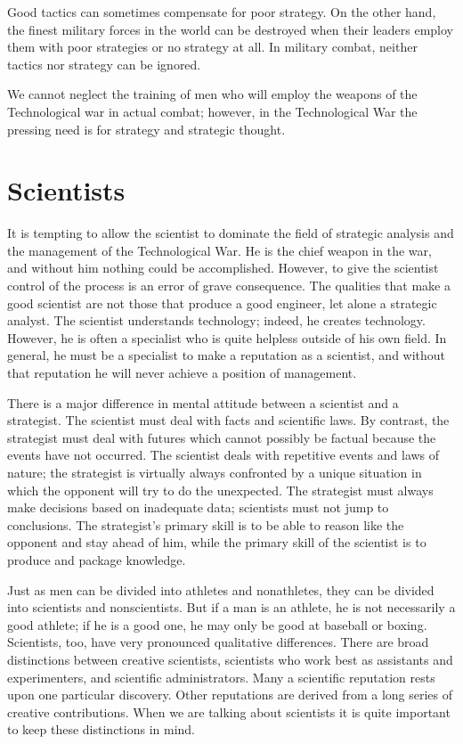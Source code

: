 Good tactics can sometimes compensate for poor strategy. On the other hand, the finest military forces in the world can be destroyed when their leaders employ them with poor strategies or no strategy at all. In military combat, neither tactics nor strategy can be ignored.

We cannot neglect the training of men who will employ the weapons of the Technological war in actual combat; however, in the Technological War the pressing need is for strategy and strategic thought.

\section{Scientists}
It is tempting to allow the scientist to dominate the field of strategic analysis and the management of the Technological War. He is the chief weapon in the war, and without him nothing could be accomplished. However, to give the scientist control of the process is an error of grave consequence. The qualities that make a good scientist are not those that produce a good engineer, let alone a strategic analyst. The scientist understands technology; indeed, he creates technology. However, he is often a specialist who is quite helpless outside of his own field. In general, he must be a specialist to make a reputation as a scientist, and without that reputation he will never achieve a position of management.

There is a major difference in mental attitude between a scientist and a strategist. The scientist must deal with facts and scientific laws. By contrast, the strategist must deal with futures which cannot possibly be factual because the events have not occurred. The scientist deals with repetitive events and laws of nature; the strategist is virtually always confronted by a unique situation in which the opponent will try to do the unexpected. The strategist must always make decisions based on inadequate data; scientists must not jump to conclusions. The strategist's primary skill is to be able to reason like the opponent and stay ahead of him, while the primary skill of the scientist is to produce and package knowledge.

Just as men can be divided into athletes and nonathletes, they can be divided into scientists and nonscientists. But if a man is an athlete, he is not necessarily a good athlete; if he is a good one, he may only be good at baseball or boxing. Scientists, too, have very pronounced qualitative differences. There are broad distinctions between creative scientists, scientists who work best as assistants and experimenters, and scientific administrators. Many a scientific reputation rests upon one particular discovery. Other reputations are derived from a long series of creative contributions. When we are talking about scientists it is quite important to keep these distinctions in mind.

